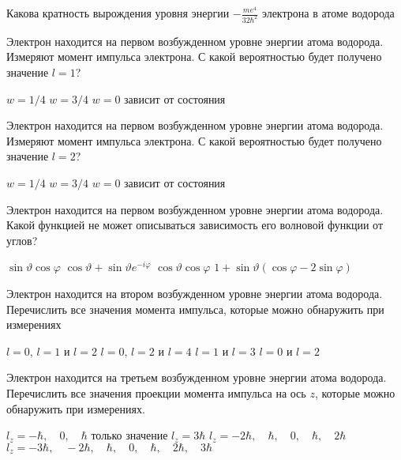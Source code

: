 \documentclass[11pt,a4paper]{exam}
\begin{document}
\begin{questions}
\question Какова кратность вырождения уровня энергии $ - \frac{{m{e^4}}}{{32{\hbar ^2}}}$ электрона в атоме водорода 
\begin{choices}
\end{choices}

\question  Электрон находится на первом возбужденном уровне энергии атома водорода. Измеряют момент импульса электрона. С какой вероятностью будет получено значение $l = 1$?
\begin{choices}
\choice $w = 1/4$         
\choice $w = 3/4$      
\choice $w = 0$     
\choice зависит от состояния
\end{choices}

\question  Электрон находится на первом возбужденном уровне энергии атома водорода. Измеряют момент импульса электрона. С какой вероятностью будет получено значение $l = 2$?
\begin{choices}
\choice $w = 1/4$         
\choice $w = 3/4$      
\choice $w = 0$     
\choice зависит от состояния
\end{choices}

\question Электрон находится на первом возбужденном уровне энергии атома водорода. Какой функцией не может описываться зависимость его волновой функции от углов?
\begin{choices}
\choice $\sin \vartheta \cos \varphi $      
\choice $\cos \vartheta  + \sin \vartheta {e^{ - i\varphi }}$    
\choice $\cos \vartheta \cos \varphi $      
\choice $1 + \sin \vartheta (\cos \varphi  - 2\sin \varphi )$
\end{choices}

\question Электрон находится на втором возбужденном уровне энергии атома водорода. Перечислить все значения момента импульса, которые можно обнаружить при измерениях
\begin{choices}
\choice $l = 0$, $l = 1$ и $l = 2$    
\choice $l = 0$, $l = 2$ и $l = 4$       
\choice $l = 1$ и $l = 3$    
\choice $l = 0$ и $l = 2$
\end{choices}

\question Электрон находится на третьем возбужденном уровне энергии атома водорода. Перечислить все значения проекции момента импульса на ось $z$, которые можно обнаружить при измерениях.
\begin{choices}
\choice ${l_z} =  - \hbar ,\quad 0,\quad \hbar $           
\choice только значение ${l_z} = 3\hbar $
\choice ${l_z} =  - 2\hbar ,\quad \hbar ,\quad 0,\quad \hbar ,\quad 2\hbar $       
\choice ${l_z} =  - 3\hbar ,\quad  - 2\hbar ,\quad \hbar ,\quad 0,\quad \hbar ,\quad 2\hbar ,\quad 3\hbar $
\end{choices}


\end{questions}
\end{document}
